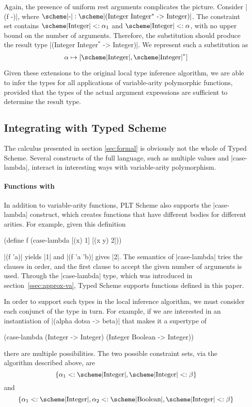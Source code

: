 \begin{schemeregion}
Again, the presence of uniform rest arguments complicates the
picture.  Consider \scheme|(f -)|, where $\hbox{\scheme|-|} : 
\hbox{\scheme|(Integer Integer$^*$ -> Integer)|}$.
The constraint set contains
$\integer <: \alpha_1$ and $\integer <: \alpha$, with no upper bound on the number of arguments.
Therefore, the  substitution should produce the result type
\scheme|(Integer Integer$^*$ -> Integer)|.  We represent such a
substitution as \[\alpha \mapsto [\integer, \integer^*]\]

Given these extensions to the original local type inference algorithm,
we are able to infer the types for all applications of variable-arity
polymorphic functions, provided that the types of the actual argument expressions are
sufficient to determine the result type.  

\subsection{Integrating with Typed Scheme}

The calculus presented in section \ref{sec:formal} is obviously not
the whole of Typed Scheme.  Several constructs of the full language,
 such as multiple values and \scheme|case-lambda|, interact in interesting ways with
variable-arity polymorphism.


\paragraph{Functions with {}}

In addition to variable-arity functions, PLT Scheme also supports the
\scheme|case-lambda| construct, which creates functions that have
different bodies for different arities.  For example, given this definition

\begin{schemedisplay}
(define f (case-lambda [(x)   1]
                       [(x y) 2]))
\end{schemedisplay}

\noindent
\scheme|(f 'a)| yields \schemeresult|1| and \scheme|(f 'a 'b)| gives
\schemeresult|2|.  The semantics of \scheme|case-lambda| tries the
clauses in order, and the first clause to accept the given number of
arguments is used.  Through the \scheme|case-lambda| type, which was
introduced in section~\ref{ssec:approx-va}, Typed Scheme supports 
functions defined in this paper.

In order to support such types in the local inference algorithm, we
must consider each conjunct of the type in turn.  For example, if we
are interested in an instantiation of \scheme|(alpha dotsa -> beta)|
that makes it a supertype of 
\begin{schemedisplay}
(case-lambda (Integer -> Integer)
             (Integer Boolean -> Integer))
\end{schemedisplay}
 there are multiple possibilities.  The
two possible constraint sets, via the algorithm described above,
 are \[\{ \alpha_1 <: \integer, \integer <: \beta\}\]
and \[\{ \alpha_1 <: \integer, \alpha_2 <: \boolean, \integer <: \beta\}\]  


\end{schemeregion}
